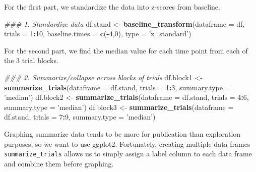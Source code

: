 \documentclass[
]{book}
\newenvironment{Shaded}{\begin{snugshade}}{\end{snugshade}}
\newcommand{\CommentTok}[1]{\textcolor[rgb]{0.56,0.35,0.01}{\textit{#1}}}
\newcommand{\DataTypeTok}[1]{\textcolor[rgb]{0.13,0.29,0.53}{#1}}
\newcommand{\DecValTok}[1]{\textcolor[rgb]{0.00,0.00,0.81}{#1}}
\newcommand{\KeywordTok}[1]{\textcolor[rgb]{0.13,0.29,0.53}{\textbf{#1}}}
\newcommand{\NormalTok}[1]{#1}
\newcommand{\OperatorTok}[1]{\textcolor[rgb]{0.81,0.36,0.00}{\textbf{#1}}}
\newcommand{\StringTok}[1]{\textcolor[rgb]{0.31,0.60,0.02}{#1}}
\begin{document}
For the first part, we standardize the data into z-scores from baseline.

\begin{Shaded}
\begin{Highlighting}[]
\CommentTok{### 1. Standardize data}
\NormalTok{df.stand <-}\StringTok{ }\KeywordTok{baseline_transform}\NormalTok{(}\DataTypeTok{dataframe =}\NormalTok{ df, }
                               \DataTypeTok{trials =} \DecValTok{1}\OperatorTok{:}\DecValTok{10}\NormalTok{, }
                               \DataTypeTok{baseline.times =} \KeywordTok{c}\NormalTok{(}\OperatorTok{-}\DecValTok{4}\NormalTok{,}\DecValTok{0}\NormalTok{),}
                               \DataTypeTok{type =} \StringTok{'z_standard'}\NormalTok{)}
\end{Highlighting}
\end{Shaded}

For the second part, we find the median value for each time point from each of the 3 trial blocks.

\begin{Shaded}
\begin{Highlighting}[]
\CommentTok{### 2. Summarize/collapse across blocks of trials}
\NormalTok{df.block1 <-}\StringTok{ }\KeywordTok{summarize_trials}\NormalTok{(}\DataTypeTok{dataframe =}\NormalTok{ df.stand, }\DataTypeTok{trials =} \DecValTok{1}\OperatorTok{:}\DecValTok{3}\NormalTok{,}
                              \DataTypeTok{summary.type =} \StringTok{'median'}\NormalTok{)}
\NormalTok{df.block2 <-}\StringTok{ }\KeywordTok{summarize_trials}\NormalTok{(}\DataTypeTok{dataframe =}\NormalTok{ df.stand, }\DataTypeTok{trials =} \DecValTok{4}\OperatorTok{:}\DecValTok{6}\NormalTok{,}
                              \DataTypeTok{summary.type =} \StringTok{'median'}\NormalTok{)}
\NormalTok{df.block3 <-}\StringTok{ }\KeywordTok{summarize_trials}\NormalTok{(}\DataTypeTok{dataframe =}\NormalTok{ df.stand, }\DataTypeTok{trials =} \DecValTok{7}\OperatorTok{:}\DecValTok{9}\NormalTok{,}
                              \DataTypeTok{summary.type =} \StringTok{'median'}\NormalTok{)}
\end{Highlighting}
\end{Shaded}

Graphing summarize data tends to be more for publication than exploration purposes, so we want to use ggplot2. Fortunately, creating multiple data frames \texttt{summarize\_trials} allows us to simply assign a label column to each data frame and combine them before graphing.

\begin{Shaded}
\end{Shaded}
\end{document}
